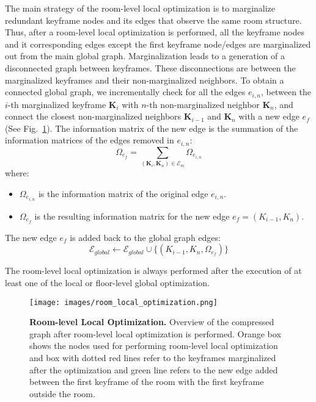 The main strategy of the room-level local optimization is to marginalize redundant keyframe nodes and its edges that observe the same room structure. Thus, after a room-level local optimization is performed, all the keyframe nodes and it corresponding edges except the first keyframe node/edges are marginalized out from the main global graph. 
Marginalization leads to a generation of a disconnected graph between keyframes. These disconnections are between the marginalized keyframes and their non-marginalized neighbors. To obtain a connected global graph, we incrementally check for all the edges $e_{i,n}$, between the $i$-th marginalized keyframe $\boldsymbol{K}_i$ with $n$-th non-marginalized neighbor $\boldsymbol{K}_n$, and connect the closest non-marginalized neighbors $\boldsymbol{K}_{i-1}$ and $\boldsymbol{K}_n$ with a new edge $e_f$ (See Fig.~\ref{fig:room_local_optimization}). The information matrix of the new edge is the summation of the information matrices of the edges removed in $e_{i,n}$:
%
\begin{equation}
    \Omega_{e_f} = \sum_{(\boldsymbol{K}_i, \boldsymbol{K}_n) \in \mathcal{E}_m} \Omega_{e_{i,n}}
\end{equation}
%
where:
\begin{itemize}
    \item $\Omega_{e_{i,n}}$ is the information matrix of the original edge $e_{i,n}$.
    \item $\Omega_{e_f}$ is the resulting information matrix for the new edge $e_f = (K_{i-1}, K_n)$.
\end{itemize}

The new edge $e_f$ is added back to the global graph edges:
\begin{equation}
    \mathcal{E}_{global} \leftarrow \mathcal{E}_{global} \cup \{ (K_{i-1}, K_n, \Omega_{e_f}) \}
\end{equation}

The room-level local optimization is always performed after the execution of at least one of the local or floor-level global optimization.


\begin{figure}[t]
  \centering
  \texttt{[image: images/room\_local\_optimization.png]}
  \caption{\textbf{Room-level Local Optimization.} Overview of the compressed graph after room-level local optimization is performed. Orange box shows the nodes used for performing room-level local optimization and box with dotted red lines refer to the keyframes marginalized after the optimization and green line refers to the new edge added between the first keyframe of the room with the first keyframe outside the room.}
  \label{fig:room_local_optimization}
\end{figure}

